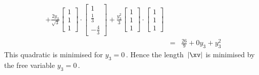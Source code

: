 \begin{example}
\begin{solution}
\begin{eqnarray*}
+\frac{2y_3}{\sqrt3}\begin{bmatrix} 1\\1\\1 \end{bmatrix}\cdot\begin{bmatrix} 1\\\frac13\\-\frac43 \end{bmatrix}
+\frac{y_3^2}{3}\begin{bmatrix} 1\\1\\1 \end{bmatrix}
\cdot\begin{bmatrix} 1\\1\\1 \end{bmatrix}
\\&=&\tfrac{26}9+0y_3+y_3^2
\end{eqnarray*}
This quadratic is minimised for \(y_3=0\)\,.
Hence the length~\(|\xv|\) is minimised by the free variable \(y_3=0\)\,.
\end{solution}
\end{example}


